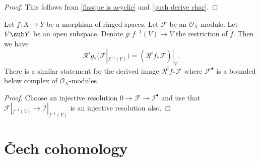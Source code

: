 \begin{proof}
This follows from \cref{flasque is acyclic} and \cref{push derive char}.
\end{proof}
\begin{proposition}
Let $f:X\to Y$ be a morphism of ringed spaces. Let $\mathscr{F}$ be an $\mathcal{O}_X$-module. Let $V\sub Y$ be an open subspace. Denote $g:f^{-1}(V)\to V$ the restriction of $f$. Then we have
\[\mathcal{R}^ig_*(\mathscr{F}|_{f^{-1}(V)})=(\mathcal{R}^if_*\mathscr{F})|_V.\]
There is a similar statement for the derived image $\mathcal{R}^if_*\mathscr{F}$ where $\mathscr{F}^\bullet$ is a bounded
below complex of $\mathcal{O}_X$-modules.
\end{proposition}
\begin{proof}
Choose an injective resolution $0\to\mathscr{F}\to\mathscr{I}^\bullet$ and use that $\mathscr{F}|_{f^{-1}(V)}\to\mathscr{I}|_{f^{-1}(V)}$ is an injective resolution also.
\end{proof}
\chapter{\v{C}ech cohomology}
